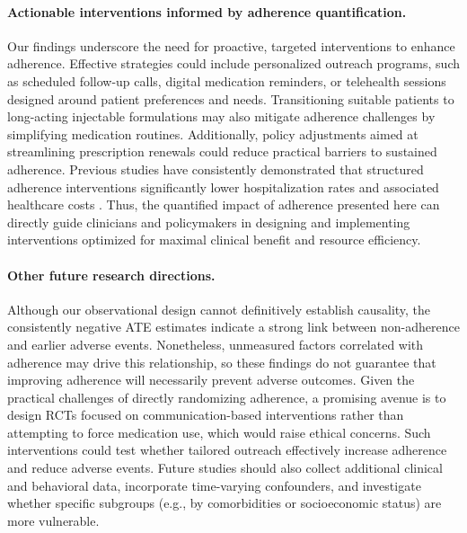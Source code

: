 \paragraph{Actionable interventions informed by adherence quantification.}
Our findings underscore the need for proactive, targeted interventions to enhance adherence. Effective strategies could include personalized outreach programs, such as scheduled follow-up calls, digital medication reminders, or telehealth sessions designed around patient preferences and needs. Transitioning suitable patients to long-acting injectable formulations may also mitigate adherence challenges by simplifying medication routines. Additionally, policy adjustments aimed at streamlining prescription renewals could reduce practical barriers to sustained adherence. Previous studies have consistently demonstrated that structured adherence interventions significantly lower hospitalization rates and associated healthcare costs \citep{velligan2009expert, kane2016comprehensive}. Thus, the quantified impact of adherence presented here can directly guide clinicians and policymakers in designing and implementing interventions optimized for maximal clinical benefit and resource efficiency.

\vspace{-.25em}
\paragraph{Other future research directions.}
Although our observational design cannot definitively establish causality, the consistently negative ATE estimates indicate a strong link between non-adherence and earlier adverse events.
Nonetheless, unmeasured factors correlated with adherence may drive this relationship, so these findings do not guarantee that improving adherence will necessarily prevent adverse outcomes.
Given the practical challenges of directly randomizing adherence, a promising avenue is to design RCTs focused on communication-based interventions rather than attempting to force medication use, which would raise ethical concerns.
Such interventions could test whether tailored outreach effectively increase adherence and reduce adverse events.
Future studies should also collect additional clinical and behavioral data, incorporate time-varying confounders, and investigate whether specific subgroups (e.g., by comorbidities or socioeconomic status) are more vulnerable.

